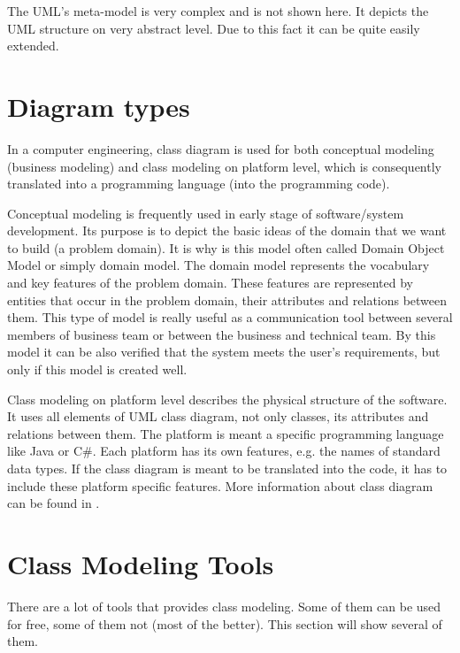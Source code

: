 The UML's meta-model is very complex and is not shown here. It depicts the UML structure on very abstract level. Due to this fact it can be quite easily extended.

\section{Diagram types}
\label{ClassDiagramDiagramTypes}

In a computer engineering, class diagram is used for both conceptual modeling (business modeling) and class modeling on platform level, which is consequently translated into a programming language (into the programming code).

Conceptual modeling is frequently used in early stage of software/system development. Its purpose is to depict the basic ideas of the domain that we want to build (a problem domain). It is why is this model often called Domain Object Model or simply domain model. The domain model represents the vocabulary and key features of the problem domain. These features are represented by entities that occur in the problem domain, their attributes and relations between them. This type of model is really useful as a communication tool between several members of business team or between the business and technical team. By this model it can be also verified that the system meets the user's requirements, but only if this model is created well.

Class modeling on platform level describes the physical structure of the software. It uses all elements of UML class diagram, not only classes, its attributes and relations between them. The platform is meant a specific programming language like Java or C\#. Each platform has its own features, e.g. the names of standard data types. If the class diagram is meant to be translated into the code, it has to include these platform specific features. More information about class diagram can be found in \cite{UMLDistilled}.

\section{Class Modeling Tools}

There are a lot of tools that provides class modeling. Some of them can be used for free, some of them not (most of the better). This section will show several of them.


